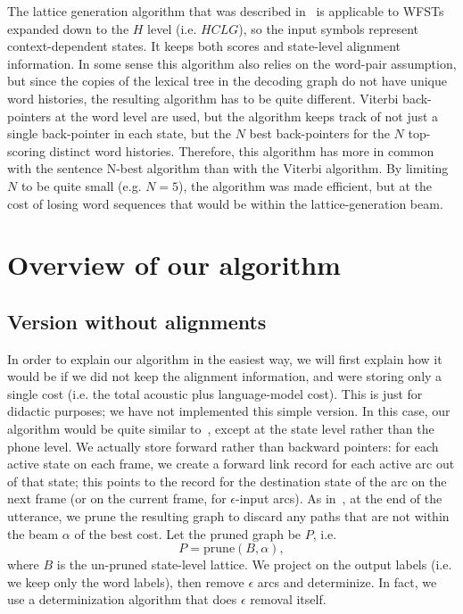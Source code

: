 \documentclass{article}
\def\HCLG{{\mathit{HCLG}}}
\begin{document}
The lattice generation algorithm that was described in~\cite{saon2005anatomy}
is applicable to WFSTs expanded down to the $H$ level (i.e. $\HCLG$),
so the input symbols represent context-dependent states.  It keeps both scores and 
state-level alignment information.  In some sense this algorithm also relies
on the word-pair assumption, but since the copies of the lexical tree in the decoding
graph do not have unique word histories, the resulting algorithm has to be quite
different.  Viterbi back-pointers at the word level are used, but the algorithm keeps track
of not just a single back-pointer in each state, but the $N$ best back-pointers for the $N$ top-scoring distinct
word histories.  Therefore, this algorithm has more in common with the sentence N-best
algorithm than with the Viterbi algorithm.  By limiting $N$ to be quite small (e.g. $N{=}5$),
the algorithm was made efficient, but at the cost of losing word sequences
that would be within the lattice-generation beam.

\vspace*{-0.075in}
\section{Overview of our algorithm}
\vspace*{-0.05in}
\label{sec:overview}

\subsection{Version without alignments}
\vspace*{-0.05in}

In order to explain our algorithm in the easiest way, we will first explain how it would
be if we did not keep the alignment information, and were storing only a single cost
(i.e. the total acoustic plus language-model cost).  This is just for didactic purposes;
we have not implemented this simple version.
In this case, our algorithm would be quite similar
to~\cite{efficient_general}, except at the state level rather than the phone level.
We actually store forward rather than backward pointers: for each active state on each
frame, we create a forward link record for each active arc out of that state; this points
to the record for the destination state of the arc on the next frame (or on 
the current frame, for $\epsilon$-input
arcs).   As in~\cite{efficient_general}, at the end of the utterance,
we prune the resulting graph to discard any paths that are not within the beam $\alpha$ of the best cost. 
Let the pruned graph be $P$, i.e.
\begin{equation}
  P = \mathrm{prune}(B, \alpha),
\end{equation}
where $B$ is the un-pruned state-level lattice.
We project on the output labels (i.e. we keep only the word labels), then remove $\epsilon$
arcs and determinize.  In fact, we use a determinization algorithm that does $\epsilon$
removal itself.
\end{document}
